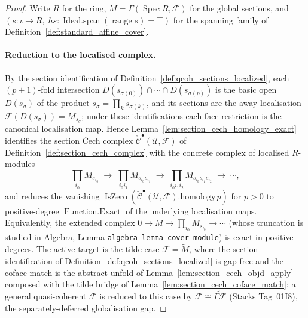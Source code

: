 \begin{proof}
  Write \(R\) for the ring, \(M = \Gamma(\operatorname{Spec} R, \mathcal{F})\) for the
  global sections, and \((s : \iota \to R,\; hs : \operatorname{Ideal.span}
  (\operatorname{range} s) = \top)\) for the spanning family of
  Definition~\ref{def:standard_affine_cover}.

  \paragraph{Reduction to the localised complex.}
  By the section identification of Definition~\ref{def:qcoh_sections_localized}, each
  \((p+1)\)-fold intersection \(D(s_{\sigma(0)}) \cap \cdots \cap D(s_{\sigma(p)})\)
  is the basic open \(D(s_\sigma)\) of the product
  \(s_\sigma = \prod_{k} s_{\sigma(k)}\), and its sections are the away localisation
  \(\mathcal{F}(D(s_\sigma)) = M_{s_\sigma}\); under these identifications each face
  restriction is the canonical localisation map. Hence
  Lemma~\ref{lem:section_cech_homology_exact} identifies the section {\v C}ech complex
  \(\check{\mathcal{C}}^\bullet(\mathcal{U}, \mathcal{F})\) of
  Definition~\ref{def:section_cech_complex} with the concrete complex of localised
  \(R\)-modules
  \[
    \prod_{i_0} M_{s_{i_0}} \;\to\;
    \prod_{i_0 i_1} M_{s_{i_0} s_{i_1}} \;\to\;
    \prod_{i_0 i_1 i_2} M_{s_{i_0} s_{i_1} s_{i_2}} \;\to\; \cdots,
  \]
  and reduces the vanishing
  \(\operatorname{IsZero}(\check{\mathcal{C}}^\bullet(\mathcal{U},
  \mathcal{F}).\mathrm{homology}\, p)\) for \(p > 0\) to positive-degree
  \(\operatorname{Function.Exact}\) of the underlying localisation maps. Equivalently,
  the extended complex \(0 \to M \to \prod_{i_0} M_{s_{i_0}} \to \cdots\) (whose
  truncation is studied in Algebra, Lemma \texttt{algebra-lemma-cover-module}) is
  exact in positive degrees. The active target is the tilde case
  \(\mathcal{F} = \widetilde{M}\), where the section identification of
  Definition~\ref{def:qcoh_sections_localized} is gap-free and the coface match is
  the abstract unfold of Lemma~\ref{lem:section_cech_objd_apply} composed with the
  tilde bridge of Lemma~\ref{lem:section_cech_coface_match}; a general quasi-coherent
  \(\mathcal{F}\) is reduced to this case by \(\mathcal{F} \cong
  \widetilde{\Gamma\mathcal{F}}\) (Stacks Tag~01I8), the separately-deferred
  globalisation gap.


\end{proof}
